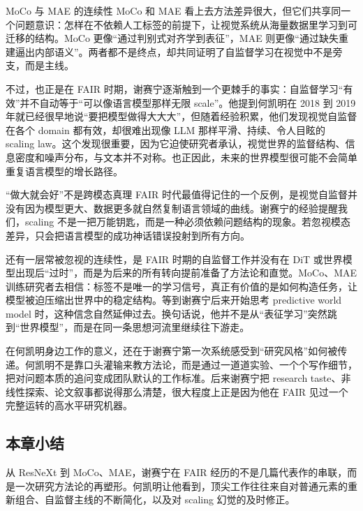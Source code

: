 \begin{knowledgebox}{MoCo 与 MAE 的连续性}
MoCo 和 MAE 看上去方法差异很大，但它们共享同一个问题意识：怎样在不依赖人工标签的前提下，让视觉系统从海量数据里学习到可迁移的结构。MoCo 更像“通过判别式对齐学到表征”，MAE 则更像“通过缺失重建逼出内部语义”。两者都不是终点，却共同证明了自监督学习在视觉中不是旁支，而是主线。
\end{knowledgebox}

不过，也正是在 FAIR 时期，谢赛宁逐渐触到一个更棘手的事实：自监督学习“有效”并不自动等于“可以像语言模型那样无限 scale”。他提到何凯明在 2018 到 2019 年就已经很早地说“要把模型做得大大大”，但随着经验积累，他们发现视觉自监督在各个 domain 都有效，却很难出现像 LLM 那样平滑、持续、令人目眩的 scaling law。这个发现很重要，因为它迫使研究者承认，视觉世界的监督结构、信息密度和噪声分布，与文本并不对称。也正因此，未来的世界模型很可能不会简单重复语言模型的增长路径。

\begin{warningbox}{“做大就会好”不是跨模态真理}
FAIR 时代最值得记住的一个反例，是视觉自监督并没有因为模型更大、数据更多就自然复制语言领域的曲线。谢赛宁的经验提醒我们，scaling 不是一把万能钥匙，而是一种必须依赖问题结构的现象。若忽视模态差异，只会把语言模型的成功神话错误投射到所有方向。
\end{warningbox}

还有一层常被忽视的连续性，是 FAIR 时期的自监督工作并没有在 DiT 或世界模型出现后“过时”，而是为后来的所有转向提前准备了方法论和直觉。MoCo、MAE 训练研究者去相信：标签不是唯一的学习信号，真正有价值的是如何构造任务，让模型被迫压缩出世界中的稳定结构。等到谢赛宁后来开始思考 predictive world model 时，这种信念自然延伸过去。换句话说，他并不是从“表征学习”突然跳到“世界模型”，而是在同一条思想河流里继续往下游走。

在何凯明身边工作的意义，还在于谢赛宁第一次系统感受到“研究风格”如何被传递。何凯明不是靠口头灌输来教方法论，而是通过一道道实验、一个个写作细节，把对问题本质的追问变成团队默认的工作标准。后来谢赛宁把 research taste、非线性探索、论文叙事都说得那么清楚，很大程度上正是因为他在 FAIR 见过一个完整运转的高水平研究机器。

\subsection{本章小结}

从 ResNeXt 到 MoCo、MAE，谢赛宁在 FAIR 经历的不是几篇代表作的串联，而是一次研究方法论的再塑形。何凯明让他看到，顶尖工作往往来自对普通元素的重新组合、自监督主线的不断简化，以及对 scaling 幻觉的及时修正。

